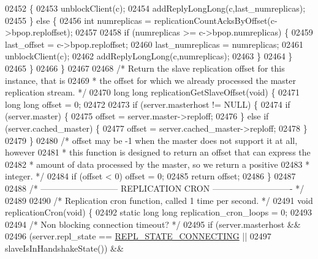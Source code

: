 \begin{DoxyCode}
{{{{{{{{{{{{{{{{{{{{{{{{{{{{{{{{{{{{{{{{{{{{{{{{{{{{{{{{{{{{{{{{{{{{{{{{{{{02452         \{
02453             unblockClient(c);
02454             addReplyLongLong(c,last\_numreplicas);
02455         \} \textcolor{keywordflow}{else} \{
02456             \textcolor{keywordtype}{int} numreplicas = replicationCountAcksByOffset(c->bpop.reploffset);
02457 
02458             \textcolor{keywordflow}{if} (numreplicas >= c->bpop.numreplicas) \{
02459                 last\_offset = c->bpop.reploffset;
02460                 last\_numreplicas = numreplicas;
02461                 unblockClient(c);
02462                 addReplyLongLong(c,numreplicas);
02463             \}
02464         \}
02465     \}
02466 \}
02467 
02468 \textcolor{comment}{/* Return the slave replication offset for this instance, that is}
02469 \textcolor{comment}{ * the offset for which we already processed the master replication stream. */}
02470 \textcolor{keywordtype}{long} \textcolor{keywordtype}{long} replicationGetSlaveOffset(\textcolor{keywordtype}{void}) \{
02471     \textcolor{keywordtype}{long} \textcolor{keywordtype}{long} offset = 0;
02472 
02473     \textcolor{keywordflow}{if} (server.masterhost != NULL) \{
02474         \textcolor{keywordflow}{if} (server.master) \{
02475             offset = server.master->reploff;
02476         \} \textcolor{keywordflow}{else} \textcolor{keywordflow}{if} (server.cached\_master) \{
02477             offset = server.cached\_master->reploff;
02478         \}
02479     \}
02480     \textcolor{comment}{/* offset may be -1 when the master does not support it at all, however}
02481 \textcolor{comment}{     * this function is designed to return an offset that can express the}
02482 \textcolor{comment}{     * amount of data processed by the master, so we return a positive}
02483 \textcolor{comment}{     * integer. */}
02484     \textcolor{keywordflow}{if} (offset < 0) offset = 0;
02485     \textcolor{keywordflow}{return} offset;
02486 \}
02487 
02488 \textcolor{comment}{/* --------------------------- REPLICATION CRON  ---------------------------- */}
02489 
02490 \textcolor{comment}{/* Replication cron function, called 1 time per second. */}
02491 \textcolor{keywordtype}{void} replicationCron(\textcolor{keywordtype}{void}) \{
02492     \textcolor{keyword}{static} \textcolor{keywordtype}{long} \textcolor{keywordtype}{long} replication\_cron\_loops = 0;
02493 
02494     \textcolor{comment}{/* Non blocking connection timeout? */}
02495     \textcolor{keywordflow}{if} (server.masterhost &&
02496         (server.repl\_state == \hyperlink{server_8h_a5fd7ad86a4a65d6486d151151a59e9a5}{REPL\_STATE\_CONNECTING} ||
02497          slaveIsInHandshakeState()) &&
}}}}}}}}}}}}}}}}}}}}}}}}}}}}}}}}}}}}}}}}}}}}}}}}}}}}}}}}}}}}}}}}}}}}}}}}}}}
\end{DoxyCode}
